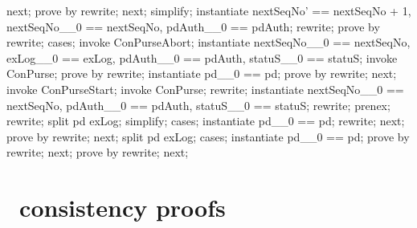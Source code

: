 \begin{LPScript}
\begin{zproof}[tStartToEafromOkayPRE]
    next;
    prove by rewrite;
    next;
    simplify;
    instantiate nextSeqNo' == nextSeqNo + 1,
        nextSeqNo\_\_0 == nextSeqNo, pdAuth\_\_0 == pdAuth;
    rewrite;
    prove by rewrite;
    cases;
    invoke ConPurseAbort;
    instantiate nextSeqNo\_\_0 == nextSeqNo, exLog\_\_0 == exLog,
        pdAuth\_\_0 == pdAuth, statuS\_\_0 == statuS;
    invoke ConPurse;
    prove by rewrite;
    instantiate pd\_\_0 == pd;
    prove by rewrite;
    next;
    invoke ConPurseStart;
    invoke ConPurse;
    rewrite;
    instantiate nextSeqNo\_\_0 == nextSeqNo, pdAuth\_\_0 == pdAuth,
        statuS\_\_0 == statuS;
    rewrite;
    prenex;
    rewrite;
    split pd \in exLog;
    simplify;
    cases;
    instantiate pd\_\_0 == pd;
    rewrite;
    next;
    prove by rewrite;
    next;
    split pd \in exLog;
    cases;
    instantiate pd\_\_0 == pd;
    prove by rewrite;
    next;
    prove by rewrite;
    next;
\end{zproof}\end{LPScript}

\section{\Betw\ consistency proofs}


